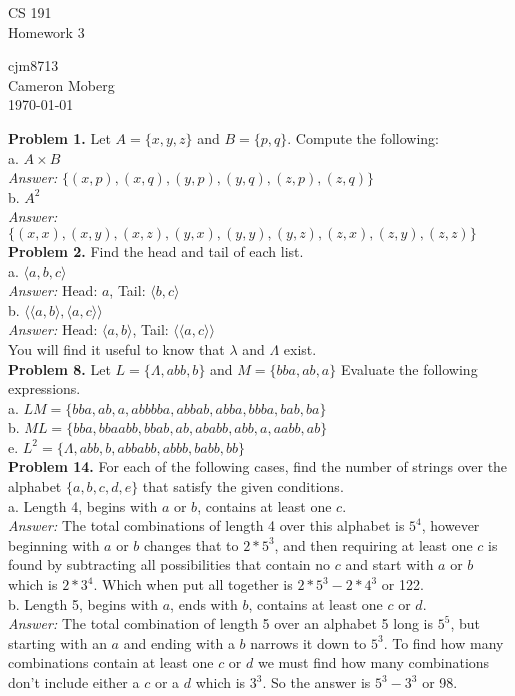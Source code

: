 \documentclass[12pt]{article}
\begin{document}
\begin{center}
\Large{CS 191\\}
\large{Homework 3\\}
\end{center}
\begin{flushright}
cjm8713\\
Cameron Moberg\\
\today\\
\end{flushright}

\textbf{Problem 1.} Let $A = \{x,y,z\}$ and $B = \{p,q\}$.  Compute the following:\\
   a. $A \times B$\\
\textit{Answer:} $\{(x,p),(x,q),(y,p),(y,q),(z,p),(z,q)\}$\\
   b. $A^2$\\
\textit{Answer:} $\{(x,x),(x,y),(x,z),(y,x),(y,y),(y,z),(z,x),(z,y),(z,z)\}$\\

\textbf{Problem 2.}  Find the head and tail of each list.\\
   a. $\langle a, b, c\rangle$\\
   \textit{Answer:} Head: $a$, Tail: $\langle b,c\rangle $\\
   b. $\langle \langle a, b \rangle, \langle a, c \rangle \rangle$ \\
   \textit{Answer:} Head: $\langle a,b \rangle$, Tail: $\langle\langle a,c\rangle\rangle $\\
You will find it useful to know that $\lambda$ and $\Lambda$ exist.\\

\textbf{Problem 8.} Let $L = \{\Lambda, abb, b\}$ and $M = \{bba,ab,a\}$ Evaluate the following expressions.\\
a. $LM = \{bba, ab, a, abbbba, abbab, abba, bbba, bab, ba\}$\\
b. $ML = \{bba, bbaabb,bbab,ab,ababb,abb,a,aabb,ab\}$\\
e. $L^2 = \{\Lambda,abb,b,abbabb,abbb,babb,bb\}$\\

\textbf{Problem 14.} For each of the following cases, find the number of strings over the alphabet $\{a,b,c,d,e\}$ that satisfy the given conditions.\\
a. Length 4, begins with $a$ or $b$, contains at least one $c$. \\
\textit{Answer: }The total combinations of length 4 over this alphabet is $5^4$, however beginning with $a$ or $b$ changes that to $2*5^3$, and then requiring at least one $c$ is found by subtracting all possibilities that contain no $c$ and start with $a$ or $b$ which is $2*3^4$. Which when put all together is $2*5^3 -2*4^3$ or 122.\\
b. Length 5, begins with $a$, ends with $b$, contains at least one $c$ or $d$.\\
\textit{Answer: }The total combination of length 5 over an alphabet 5 long is $5^5$, but starting with an $a$ and ending with a $b$ narrows it down to $5^3$. To find how many combinations contain at least one $c$ or $d$ we must find how many combinations don't include either a $c$ or a $d$ which is $3^3$. So the answer is $5^3 - 3^3$ or 98.
\end{document}
